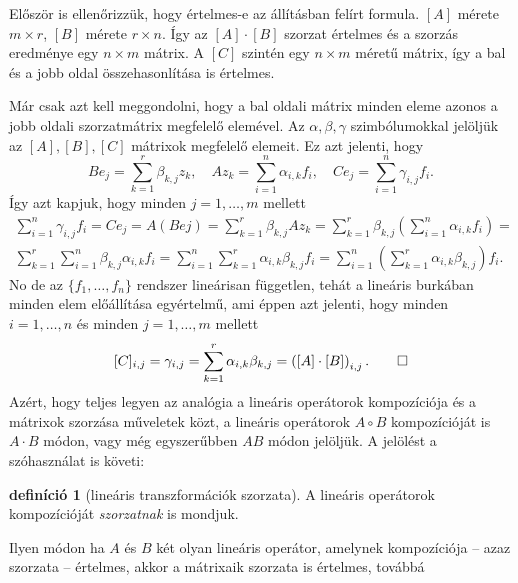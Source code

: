 \documentclass[9pt, showtrims]{memoir}
\makeatletter
\renewenvironment{proof}[1][\proofname]
    {\par\pushQED{\qed}%
    \normalfont \topsep6\p@\@plus6\p@\relax
    \trivlist
    \item[\hskip\labelsep
        \itshape
    #1\@addpunct{:}]\ignorespaces}
    {\popQED\endtrivlist\@endpefalse}
\theoremstyle{plain}
\theoremstyle{remark}
\theoremstyle{definition}
\newtheorem{definition}[proposition]{definíció}
\makeatother
\begin{document}
\begin{proof}
    Először is ellenőrizzük, hogy értelmes-e az állításban felírt formula.
    $\left[ A \right]$ mérete $m\times r$, $\left[ B \right]$ mérete $r\times n$.
    Így az $[A]\cdot[B]$ szorzat értelmes és a szorzás eredménye egy $n\times m$ mátrix.
    A $[C]$ szintén egy $n\times m$ méretű mátrix, 
    így a bal és a jobb oldal összehasonlítása is értelmes.

    Már csak azt kell meggondolni, 
    hogy a bal oldali mátrix minden eleme azonos a jobb oldali szorzatmátrix megfelelő elemével.
    Az $\alpha,\beta,\gamma$ szimbólumokkal jelöljük az $[A],[B], [C]$ mátrixok megfelelő elemeit.
    Ez azt jelenti, hogy
    \[
        Be_j=\sum_{k=1}^r\beta_{k,j}z_k,\quad
        Az_k=\sum_{i=1}^n\alpha_{i,k}f_i,\quad
        Ce_j=\sum_{i=1}^n\gamma_{i,j}f_i.
    \]
    Így azt kapjuk, hogy minden $j=1,\dots,m$ mellett
    \begin{multline*}
        \sum_{i=1}^n\gamma_{i,j}f_i
        =
        Ce_j
        =A\left( Bej \right)
        =
        \sum_{k=1}^r\beta_{k,j}Az_k
        =
        \sum_{k=1}^r\beta_{k,j}\left( \sum_{i=1}^n\alpha_{i,k}f_i \right)
        =\\
        \sum_{k=1}^r\sum_{i=1}^n\beta_{k,j}\alpha_{i,k}f_i
        =
        \sum_{i=1}^n\sum_{k=1}^r\alpha_{i,k}\beta_{k,j}f_i
        =
        \sum_{i=1}^n\left( \sum_{k=1}^r\alpha_{i,k}\beta_{k,j} \right)f_i.
    \end{multline*}
    No de az $\{f_1,\dots,f_n\}$ rendszer lineárisan független,
    tehát a lineáris burkában minden elem előállítása egyértelmű,
    ami éppen azt jelenti, hogy minden $i=1,\dots,n$ és minden $j=1,\dots,m$ mellett
    \[
        [C]_{i,j}=\gamma_{i,j}
        =\sum_{k=1}^r\alpha_{i,k}\beta_{k,j}
        =\left( \left[ A \right]\cdot\left[ B \right] \right)_{i,j}.\qedhere
    \]
\end{proof}
Azért, hogy teljes legyen az analógia a lineáris operátorok kompozíciója és a mátrixok szorzása műveletek közt,
a lineáris operátorok $A\circ B$ kompozícióját is $A\cdot B$ módon, vagy még egyszerűbben $AB$ módon jelöljük.
A jelölést a szóhasználat is követi:
\begin{definition}[lineáris transzformációk szorzata]
    A lineáris operátorok kompozícióját \emph{szorzatnak} is mondjuk.
\end{definition}
\noindent Ilyen módon ha $A$ és $B$ két olyan lineáris operátor, amelynek kompozíciója -- azaz szorzata -- értelmes,
akkor a mátrixaik szorzata is értelmes, továbbá
\end{document}
